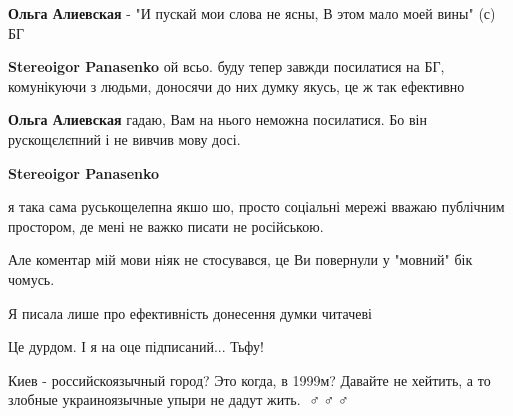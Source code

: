 \begin{itemize}
\begin{itemize}
\textbf{Ольга Алиевская} - "И пускай мои слова не ясны,
В этом мало моей вины" (с) БГ

 
\textbf{Stereoigor Panasenko} ой всьо.
буду тепер завжди посилатися на БГ, комунікуючи з людьми, доносячи до них думку якусь, це ж так ефективно

 
\textbf{Ольга Алиевская} гадаю, Вам на нього неможна посилатися.
Бо він рускощєлєпний і не вивчив мову досі.

 
\textbf{Stereoigor Panasenko} 

я така сама руськощелепна якшо шо, просто соціальні мережі вважаю публічним
простором, де мені не важко писати не російською.

Але коментар мій мови ніяк не стосувався, це Ви повернули у "мовний" бік
чомусь.

Я писала лише про ефективність донесення думки читачеві
\end{itemize}

 
Це дурдом. І я на оце підписаний... Тьфу!

 
Киев - российскоязычный город? Это когда, в 1999м?
Давайте не хейтить, а то злобные украиноязычные упыри не дадут жить.
🤦♂️🤦♂️🤦♂️


\end{itemize}
